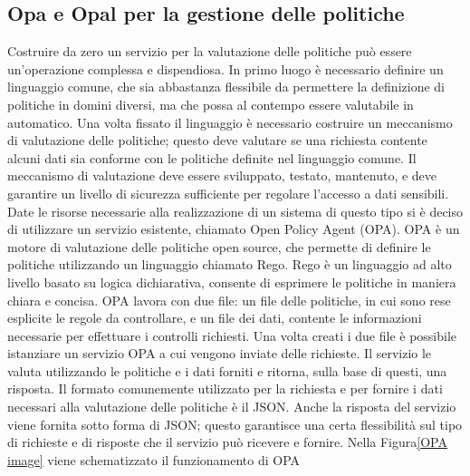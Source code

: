 \documentclass[12pt]{report}
\begin{document}
\subsection{Opa e Opal per la gestione delle politiche}\label{opa_opal}
Costruire da zero un servizio per la valutazione delle politiche può essere un'operazione complessa e dispendiosa.
In primo luogo è necessario definire un linguaggio comune, che sia abbastanza flessibile da permettere la definizione di politiche in domini diversi, ma che possa al contempo essere valutabile in automatico.
Una volta fissato il linguaggio è necessario costruire un meccanismo di valutazione delle politiche; questo deve valutare se una richiesta contente alcuni dati sia conforme con le politiche definite nel linguaggio comune. 
Il meccanismo di valutazione deve essere sviluppato, testato, mantenuto, e deve garantire un livello di sicurezza sufficiente per regolare l'accesso a dati sensibili.
Date le risorse necessarie alla realizzazione di un sistema di questo tipo si è deciso di utilizzare un servizio esistente, chiamato Open Policy Agent (OPA).
OPA è un motore di valutazione delle politiche open source\cite{noauthor_open_nodate}, che permette di definire le politiche utilizzando un linguaggio chiamato Rego.
Rego è un linguaggio ad alto livello basato su logica dichiarativa, consente di esprimere le politiche in maniera chiara e concisa.
OPA lavora con due file: un file delle politiche, in cui sono rese esplicite le regole da controllare, e un file dei dati, contente le informazioni necessarie per effettuare i controlli richiesti.
Una volta creati i due file è possibile istanziare un servizio OPA a cui vengono inviate delle richieste.
Il servizio le valuta utilizzando le politiche e i dati forniti e ritorna, sulla base di questi, una risposta.
Il formato comunemente utilizzato per la richiesta e per fornire i dati necessari alla valutazione delle politiche è il JSON.
Anche la risposta del servizio viene fornita sotto forma di JSON; questo garantisce una certa flessibilità sul tipo di richieste e di risposte che il servizio può ricevere e  fornire.
Nella Figura\ref{OPA image} viene schematizzato il funzionamento di OPA
\end{document}
